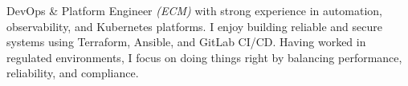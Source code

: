 \par{
DevOps \& Platform Engineer \emph{(ECM)} with strong experience in automation, observability, and Kubernetes platforms. I enjoy building reliable and secure systems using Terraform, Ansible, and GitLab CI/CD.
Having worked in regulated environments, I focus on doing things right by balancing performance, reliability, and compliance.
}